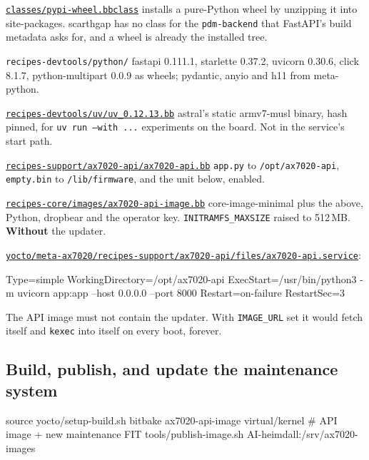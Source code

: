 \documentclass[11pt,a4paper,oneside]{article}
\newcommand{\file}[1]{{\color{bluemid}\nolinkurl{#1}}}
\newcommand{\cmd}[1]{\texttt{#1}}
\newcommand{\repo}{https://github.com/MaxClerkwell/ax7020-bringup}
\newcommand{\rfile}[1]{\href{\repo/blob/master/#1}{\color{bluemid}\nolinkurl{#1}}}
\newcommand{\lfile}[1]{\href{\repo/blob/master/yocto/meta-ax7020/#1}{\color{bluemid}\nolinkurl{#1}}}
\begin{document}
\begin{filelist}
  \item[\lfile{classes/pypi-wheel.bbclass}] installs a pure-Python wheel by unzipping it into site-packages. scarthgap has no class for the \cmd{pdm-backend} that FastAPI's build metadata asks for, and a wheel is already the installed tree.
  \item[\file{recipes-devtools/python/}] fastapi 0.111.1, starlette 0.37.2, uvicorn 0.30.6, click 8.1.7, python-multipart 0.0.9 as wheels; pydantic, anyio and h11 from meta-python.
  \item[\lfile{recipes-devtools/uv/uv_0.12.13.bb}] astral's static armv7-musl binary, hash pinned, for \cmd{uv run --with ...} experiments on the board. Not in the service's start path.
  \item[\lfile{recipes-support/ax7020-api/ax7020-api.bb}] \file{app.py} to \file{/opt/ax7020-api}, \file{empty.bin} to \file{/lib/firmware}, and the unit below, enabled.
  \item[\lfile{recipes-core/images/ax7020-api-image.bb}] core-image-minimal plus the above, Python, dropbear and the operator key. \cmd{INITRAMFS\_MAXSIZE} raised to 512\,MB. \textbf{Without} the updater.
\end{filelist}

\rfile{yocto/meta-ax7020/recipes-support/ax7020-api/files/ax7020-api.service}:

\begin{code}
[Service]
Type=simple
WorkingDirectory=/opt/ax7020-api
ExecStart=/usr/bin/python3 -m uvicorn app:app --host 0.0.0.0 --port 8000
Restart=on-failure
RestartSec=3
\end{code}

\begin{mustknow}
The API image must not contain the updater. With \cmd{IMAGE\_URL} set it
would fetch itself and \cmd{kexec} into itself on every boot, forever.
\end{mustknow}

\subsection{Build, publish, and update the maintenance system}

\begin{shell}
source yocto/setup-build.sh
bitbake ax7020-api-image virtual/kernel        # API image + new maintenance FIT
tools/publish-image.sh AI-heimdall:/srv/ax7020-images
\end{shell}
\end{document}
